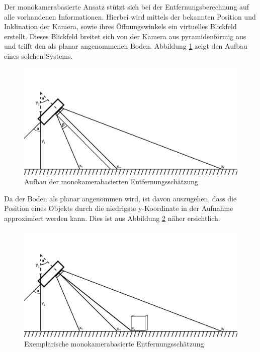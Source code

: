 Der monokamerabasierte Ansatz stützt sich bei der Entfernungsberechnung auf alle vorhandenen Informationen. Hierbei wird mittels der bekannten Position und Inklination der Kamera, sowie ihres Öffnungswinkels ein virtuelles Blickfeld erstellt. Dieses Blickfeld breitet sich von der Kamera aus pyramidenförmig aus und trifft den als planar angenommenen Boden. Abbildung \ref{fig:MonokameraEntfernung} zeigt den Aufbau eines solchen Systems. 

\begin{figure}[h]
\centering
\includegraphics[width=\textwidth]{Bilder/Workloop/Monokamera}
\caption{Aufbau der monokamerabasierten Entfernungsschätzung}
\label{fig:MonokameraEntfernung}
\end{figure}

Da der Boden als planar angenommen wird, ist davon auszugehen, dass die Position eines Objekts durch die niedrigste y-Koordinate in der Aufnahme approximiert werden kann. Dies ist aus Abbildung \ref{fig:MonokameraEntfernung2} näher ersichtlich. 

\begin{figure}[h]
\centering
\includegraphics[width=\textwidth]{Bilder/Workloop/Monokamera2}
\caption{Exemplarische monokamerabasierte Entfernungsschätzung}
\label{fig:MonokameraEntfernung2}
\end{figure}

